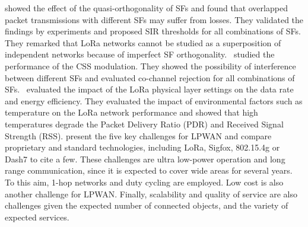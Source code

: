  \cite{croce_impact_2018}   \citet{croce_impact_2018} showed the effect of the quasi-orthogonality of SFs and found that overlapped packet transmissions with different SFs may suffer from losses. They validated the findings by experiments and proposed SIR thresholds for all combinations of SFs. They remarked that LoRa networks cannot be studied as a superposition of independent networks because of imperfect SF orthogonality.~   \newline 
 \cite{goursaud_dedicated_2015}   \citet{goursaud_dedicated_2015} studied the performance of the CSS modulation. They showed the possibility of interference between different SFs and evaluated co-channel rejection for all combinations of SFs.~   \newline 
 \cite{marco_cattani_experimental_2017}   \citet{marco_cattani_experimental_2017} evaluated the impact of the LoRa physical layer settings on the data rate and energy efficiency. They evaluated the impact of environmental factors such as temperature on the LoRa network performance and showed that high temperatures degrade the Packet Delivery Ratio (PDR) and Received Signal Strength (RSS).   \newline 
 \cite{raza_low_2017}   \citet{raza_low_2017} present the five key challenges for LPWAN and compare proprietary and standard technologies, including LoRa, Sigfox, 802.15.4g or Dash7 to cite a few. These challenges are ultra low-power operation and long range communication, since it is expected to cover wide areas for several years. To this aim, 1-hop networks and duty cycling are employed. Low cost is also another challenge for LPWAN. Finally, scalability and quality of service are also challenges given the expected number of connected objects, and the variety of expected services.   \newline 
